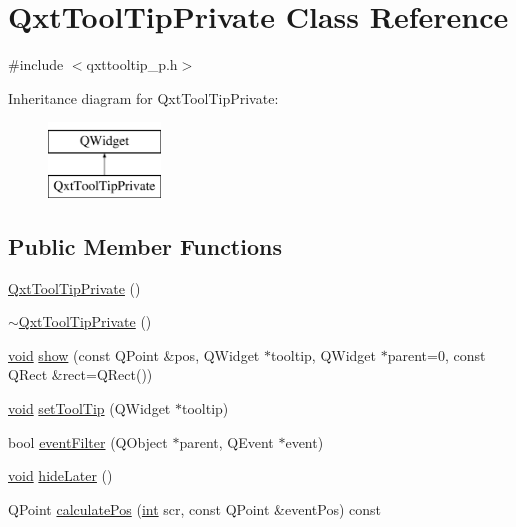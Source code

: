 \hypertarget{class_qxt_tool_tip_private}{\section{Qxt\-Tool\-Tip\-Private Class Reference}
\label{class_qxt_tool_tip_private}
}


{\ttfamily \#include $<$qxttooltip\-\_\-p.\-h$>$}

Inheritance diagram for Qxt\-Tool\-Tip\-Private\-:\begin{figure}[H]
\begin{center}
\leavevmode
\includegraphics[height=2.000000cm]{class_qxt_tool_tip_private}
\end{center}
\end{figure}
\subsection*{Public Member Functions}
\begin{DoxyCompactItemize}
\item 
\hyperlink{class_qxt_tool_tip_private_a08a75ebc9a51ac66ae31ffc16534af23}{Qxt\-Tool\-Tip\-Private} ()
\item 
\hyperlink{class_qxt_tool_tip_private_ab62b17bb628437473e6184f3d81ac707}{$\sim$\-Qxt\-Tool\-Tip\-Private} ()
\item 
\hyperlink{group___u_a_v_objects_plugin_ga444cf2ff3f0ecbe028adce838d373f5c}{void} \hyperlink{class_qxt_tool_tip_private_ab42b97676e18a8d1ec7374215c7c412d}{show} (const Q\-Point \&pos, Q\-Widget $\ast$tooltip, Q\-Widget $\ast$parent=0, const Q\-Rect \&rect=Q\-Rect())
\item 
\hyperlink{group___u_a_v_objects_plugin_ga444cf2ff3f0ecbe028adce838d373f5c}{void} \hyperlink{class_qxt_tool_tip_private_aa825fa4f23a70e4e08abc523823e5bbb}{set\-Tool\-Tip} (Q\-Widget $\ast$tooltip)
\item 
bool \hyperlink{class_qxt_tool_tip_private_ac2e25cf98d2dcc4b4ca21f45383299e0}{event\-Filter} (Q\-Object $\ast$parent, Q\-Event $\ast$event)
\item 
\hyperlink{group___u_a_v_objects_plugin_ga444cf2ff3f0ecbe028adce838d373f5c}{void} \hyperlink{class_qxt_tool_tip_private_a2ccf15e4c1413e3b96eb25c9d5b0dadc}{hide\-Later} ()
\item 
Q\-Point \hyperlink{class_qxt_tool_tip_private_a82b343fa6214ae026d356701457e45bf}{calculate\-Pos} (\hyperlink{ioapi_8h_a787fa3cf048117ba7123753c1e74fcd6}{int} scr, const Q\-Point \&event\-Pos) const 
\end{DoxyCompactItemize}
